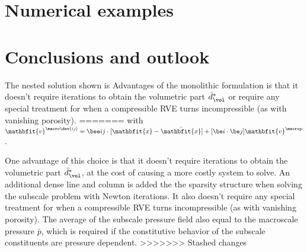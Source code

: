 \documentclass[a4paper,11pt]{article}
\renewcommand{\ta}[1]{\mathbfit{#1}}
\newcommand{\pressure}{\mathrm{p}}
\begin{document}
\section{Numerical examples} \label{sec:numerical_examples}

\section{Conclusions and outlook} \label{sec:conclusions}
The nested solution shown is 
Advantages of the monolithic formulation is that it doesn't require iterations to obtain the volumetric part $\bar{d}_\vol^*$ or require any special treatment 
for when a compressible RVE turns incompressible (as with vanishing porosity).
=======
with $\ta v^{\macro\dev(ij)} = \bee ij \cdot [\ta x - \bar{\ta x}] + [\be i\cdot\be j]\ta v^{\macro\pressure}$.

One advantage of this choice is that it doesn't require iterations to obtain the volumetric part $\bar{d}_\vol^*$, at the cost of causing a more costly system to solve. An additional dense line and column is added the the sparsity structure when solving the subscale problem with Newton iterations.
It also doesn't require any special treatment for when a compressible RVE turns incompressible (as with vanishing porosity). The average of the subscale pressure field also equal to the macroscale pressure $\bar p$, which is required if the constitutive behavior of the subscale constituents are pressure dependent.
>>>>>>> Stashed changes
\end{document}
